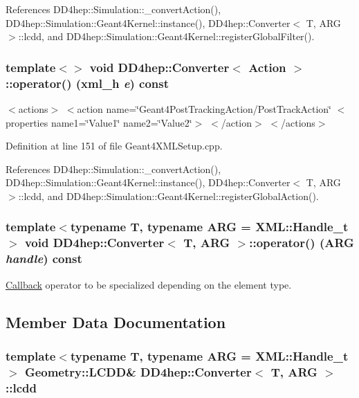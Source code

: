 References DD4hep::Simulation::\_\-convertAction(), DD4hep::Simulation::Geant4Kernel::instance(), DD4hep::Converter$<$ T, ARG $>$::lcdd, and DD4hep::Simulation::Geant4Kernel::registerGlobalFilter().\hypertarget{struct_d_d4hep_1_1_converter_aed84f0c27418a0bf8a6228b2fa932c23}{
\subsubsection[{operator()}]{\setlength{\rightskip}{0pt plus 5cm}template$<$$>$ void {\bf DD4hep::Converter}$<$ {\bf Action} $>$::operator() ({\bf xml\_\-h} {\em e}) const}}
\label{struct_d_d4hep_1_1_converter_aed84f0c27418a0bf8a6228b2fa932c23}
$<$actions$>$ $<$action name=\char`\"{}Geant4PostTrackingAction/PostTrackAction\char`\"{} $<$properties name1=\char`\"{}Value1\char`\"{} name2=\char`\"{}Value2\char`\"{}$>$ $<$/action$>$ $<$/actions$>$ 

Definition at line 151 of file Geant4XMLSetup.cpp.

References DD4hep::Simulation::\_\-convertAction(), DD4hep::Simulation::Geant4Kernel::instance(), DD4hep::Converter$<$ T, ARG $>$::lcdd, and DD4hep::Simulation::Geant4Kernel::registerGlobalAction().\hypertarget{struct_d_d4hep_1_1_converter_a7584b9a6f22f1c29a26421c008bec963}{
\subsubsection[{operator()}]{\setlength{\rightskip}{0pt plus 5cm}template$<$typename T, typename ARG = XML::Handle\_\-t$>$ void {\bf DD4hep::Converter}$<$ {\bf T}, ARG $>$::operator() (ARG {\em handle}) const}}
\label{struct_d_d4hep_1_1_converter_a7584b9a6f22f1c29a26421c008bec963}


\hyperlink{class_d_d4hep_1_1_callback}{Callback} operator to be specialized depending on the element type. 

\subsection{Member Data Documentation}
\hypertarget{struct_d_d4hep_1_1_converter_acefaa7bdcbf210e64d96db04f90b5c9c}{
\subsubsection[{lcdd}]{\setlength{\rightskip}{0pt plus 5cm}template$<$typename T, typename ARG = XML::Handle\_\-t$>$ {\bf Geometry::LCDD}\& {\bf DD4hep::Converter}$<$ {\bf T}, ARG $>$::{\bf lcdd}}}
\label{struct_d_d4hep_1_1_converter_acefaa7bdcbf210e64d96db04f90b5c9c}


